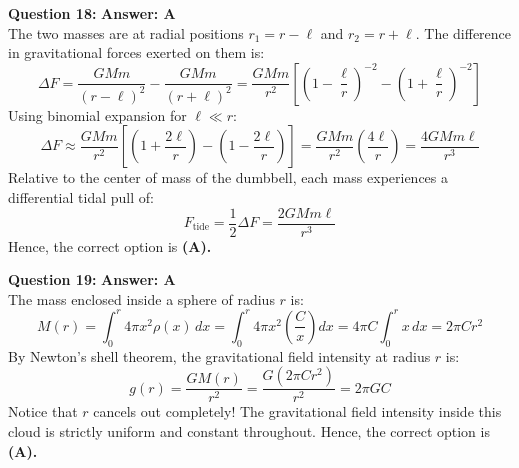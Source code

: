 \documentclass[11pt,a4paper]{article}
\begin{document}
\begin{tcolorbox}[solbox]
  \textbf{\textcolor{primaryDark}{Question 18:}} \hfill \textbf{\textcolor{l3Crimson}{Answer: A}}\\
  \vspace{3pt}
  The two masses are at radial positions $r_1 = r - \ell$ and $r_2 = r + \ell$.
The difference in gravitational forces exerted on them is:
$$\Delta F = \frac{GMm}{(r-\ell)^2} - \frac{GMm}{(r+\ell)^2} = \frac{GMm}{r^2}\left[\left(1 - \frac{\ell}{r}\right)^{-2} - \left(1 + \frac{\ell}{r}\right)^{-2}\right]$$
Using binomial expansion for $\ell \ll r$:
$$\Delta F \approx \frac{GMm}{r^2}\left[\left(1 + \frac{2\ell}{r}\right) - \left(1 - \frac{2\ell}{r}\right)\right] = \frac{GMm}{r^2}\left(\frac{4\ell}{r}\right) = \frac{4GMm\ell}{r^3}$$
\vspace{3pt}
Relative to the center of mass of the dumbbell, each mass experiences a differential tidal pull of:
$$F_{\text{tide}} = \frac{1}{2}\Delta F = \frac{2GMm\ell}{r^3}$$
\vspace{3pt}
Hence, the correct option is \textbf{(A)}\textbf{.}
\end{tcolorbox}
\vspace{3pt}

\begin{tcolorbox}[solbox]
  \textbf{\textcolor{primaryDark}{Question 19:}} \hfill \textbf{\textcolor{l3Crimson}{Answer: A}}\\
  \vspace{3pt}
  The mass enclosed inside a sphere of radius $r$ is:
$$M(r) = \int_0^r 4\pi x^2 \rho(x)\,dx = \int_0^r 4\pi x^2 \left(\frac{C}{x}\right)dx = 4\pi C \int_0^r x\,dx = 2\pi C r^2$$
\vspace{3pt}
By Newton's shell theorem, the gravitational field intensity at radius $r$ is:
$$g(r) = \frac{G M(r)}{r^2} = \frac{G(2\pi C r^2)}{r^2} = 2\pi G C$$
\vspace{3pt}
Notice that $r$ cancels out completely! The gravitational field intensity inside this cloud is strictly uniform and constant throughout.
\vspace{3pt}
Hence, the correct option is \textbf{(A)}\textbf{.}
\end{tcolorbox}
\vspace{3pt}
\end{document}
